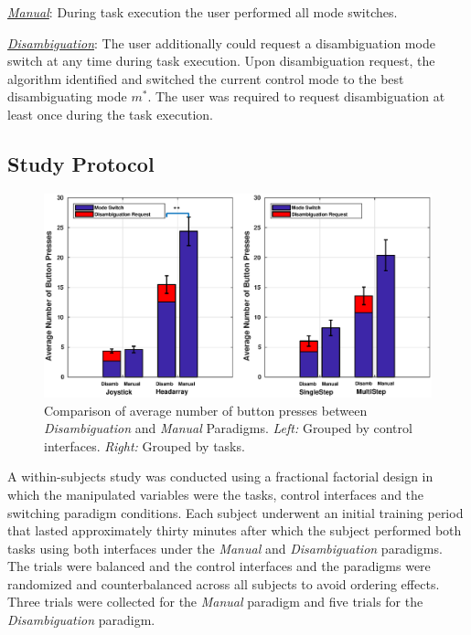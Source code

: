 \noindent\underline{\textit{Manual}}: During task execution the user performed all mode switches. 

\noindent\underline{\textit{Disambiguation}}: The user additionally could request a disambiguation mode switch at any time during task execution. Upon disambiguation request, the algorithm identified and switched the current control mode to the best disambiguating mode $m^*$. The user was required to request disambiguation at least once during the task execution.  



\subsection{Study Protocol}
 
\begin{figure}[ht!]
	\centering
	\includegraphics[keepaspectratio, width = 0.91\hsize ,center]{./finalfigures/Fig7.eps}
	\caption{Comparison of average number of button presses between \textit{Disambiguation} and \textit{Manual} Paradigms. \textit{Left:} Grouped by control interfaces. \textit{Right:} Grouped by tasks.}
	\label{fig:button_press}
\end{figure}
A within-subjects study was conducted using a fractional factorial design in which the manipulated variables were the tasks, control interfaces and the switching paradigm conditions. Each subject underwent an initial training period that lasted approximately thirty minutes after which the subject performed both tasks using both interfaces under the \textit{Manual} and \textit{Disambiguation} paradigms. The trials were balanced and the control interfaces and the paradigms were randomized and counterbalanced across all subjects to avoid ordering effects. Three trials were collected for the \textit{Manual} paradigm and five trials for the \textit{Disambiguation} paradigm. 

